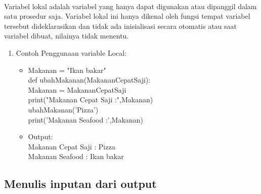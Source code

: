 \documentclass{article}
\begin{document}
            \paragraph{}Variabel lokal adalah variabel yang hanya dapat digunakan atau dipanggil dalam satu prosedur saja. Variabel lokal ini hanya dikenal oleh fungsi tempat variabel tersebut dideklarasikan dan tidak ada inisialisasi secara otomatis atau saat variabel dibuat, nilainya tidak menentu.
                \begin{enumerate}
                    \item Contoh Penggunaan variable Local:
                        \begin{itemize}
                            \item Makanan = "Ikan bakar"\\
                                    def ubahMakanan(MakananCepatSaji):\\
                                        Makanan = MakananCepatSaji\\
                                        print("Makanan Cepat Saji :",Makanan)\\
                                     
                                    ubahMakanan('Pizza')\\
                                    print('Makanan Seafood :',Makanan)\\
                            \item Output:\\ 
                                    Makanan Cepat Saji : Pizza\\
                                    Makanan Seafood : Ikan bakar
                        \end{itemize}
                \end{enumerate}
        
    \subsection{Menulis inputan dari output}   
\end{document}
